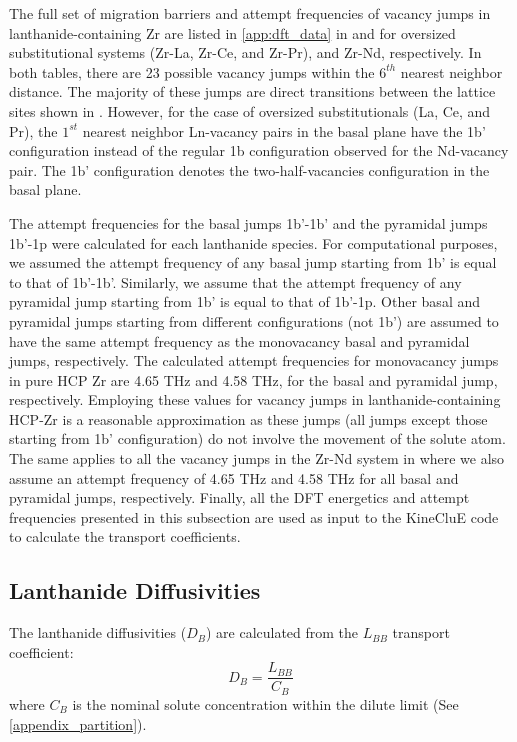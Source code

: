 \documentclass[preprint,12pt]{elsarticle}
\begin{document}
The full set of migration barriers and attempt frequencies of vacancy jumps in lanthanide-containing Zr are listed in \ref{app:dft_data} in  and  for oversized substitutional systems (Zr-La, Zr-Ce, and Zr-Pr), and Zr-Nd, respectively. In both tables, there are 23 possible vacancy jumps within the $6^{th}$ nearest neighbor distance. The majority of these jumps are direct transitions between the lattice sites shown in . However, for the case of oversized substitutionals (La, Ce, and Pr), the $1^{st}$ nearest neighbor Ln-vacancy pairs in the basal plane have the 1b' configuration instead of the regular 1b configuration observed for the Nd-vacancy pair. The 1b' configuration denotes the two-half-vacancies configuration in the basal plane.


The attempt frequencies for the basal jumps 1b'-1b' and the pyramidal jumps 1b'-1p were calculated for each lanthanide species. For computational purposes, we assumed the attempt frequency of any basal jump starting from 1b' is equal to that of 1b'-1b'. Similarly, we assume that the attempt frequency of any pyramidal jump starting from 1b' is equal to that of 1b'-1p. Other basal and pyramidal jumps starting from different configurations (not 1b') are assumed to have the same attempt frequency as the monovacancy basal and pyramidal jumps, respectively. The calculated attempt frequencies for monovacancy jumps in pure HCP Zr are 4.65 THz and 4.58 THz, for the basal and pyramidal jump, respectively. Employing these values for vacancy jumps in lanthanide-containing HCP-Zr is a reasonable approximation as these jumps (all jumps except those starting from 1b' configuration) do not involve the movement of the solute atom. The same applies to all the vacancy jumps in the Zr-Nd system in  where we also assume an attempt frequency of 4.65 THz and 4.58 THz for all basal and pyramidal jumps, respectively. Finally, all the DFT energetics and attempt frequencies presented in this subsection are used as input to the KineCluE code\cite{schuler_kineclue_2020} to calculate the transport coefficients.

\FloatBarrier

\subsection{Lanthanide Diffusivities}
\label{subsection_diffusivities}

The lanthanide diffusivities ($D_B$) are calculated from the $L_{BB}$ transport coefficient:
\begin{equation}
\label{solute_diffusion_coeff}
    D_B = \frac{L_{BB}}{C_B}
\end{equation}
where $C_B$ is the nominal solute concentration within the dilute limit (See \ref{appendix_partition}). 
\end{document}
